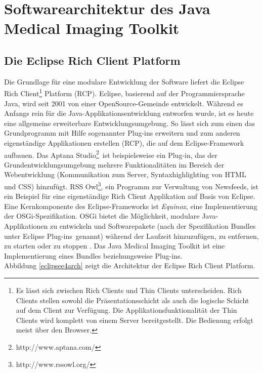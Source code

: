 \chapter{Softwarearchitektur des Java Medical Imaging Toolkit}

\section{Die Eclipse Rich Client Platform}

Die Grundlage für eine modulare Entwicklung der Software liefert die Eclipse Rich Client\footnote{Es lässt sich zwischen Rich Clients und Thin Clients unterscheiden. Rich Clients stellen sowohl die Präsentationsschicht als auch die logische Schicht auf dem Client zur Verfügung. Die Applikationsfunktionalität der Thin Clients wird komplett von einem Server bereitgestellt. Die Bedienung erfolgt meist über den Browser.} Platform (RCP). Eclipse, basierend auf der Programmiersprache Java, wird seit 2001 von einer OpenSource-Gemeinde entwickelt\cite{vogel:eclipseoverview}. Während es Anfangs rein für die Java-Applikationsentwicklung entworfen wurde, ist es heute eine allgemeine erweiterbare Entwicklungsumgebung. So lässt sich zum einen das Grundprogramm mit Hilfe sogenannter Plug-ins erweitern und zum anderen eigenständige Applikationen erstellen (RCP), die auf dem Eclipse-Framework aufbauen. Das \glqq Aptana Studio\footnote{http://www.aptana.com/}\grqq\ ist beispielsweise ein Plug-in, das der Grundentwicklungsumgebung mehrere Funktionalitäten im Bereich der Webentwicklung (Kommunikation zum Server, Syntaxhighlighting von HTML und CSS) hinzufügt. RSS Owl\footnote{http://www.rssowl.org/}, ein Programm zur Verwaltung von Newsfeeds, ist ein Beispiel für eine eigenständige Rich Client Applikation auf Basis von Eclipse.\\
Eine Kernkomponente des Eclipse-Frameworks ist \textit{Equinox}, eine Implementierung der OSGi-Spezifikation. OSGi bietet die Möglichkeit, modulare Java-Applikationen zu entwickeln und Softwarepakete (nach der Spezifikation \glqq Bundles\grqq\, unter Eclipse \glqq Plug-ins\grqq\ genannt) während der Laufzeit hinzuzufügen, zu entfernen, zu starten oder zu stoppen \cite{vogel:e4overview}. Das Java Medical Imaging Toolkit ist eine Implementierung eines Bundles beziehungsweise Plug-ins.\\
Abbildung \ref{eclipsee4arch} zeigt die Architektur der Eclipse Rich Client Platform.

